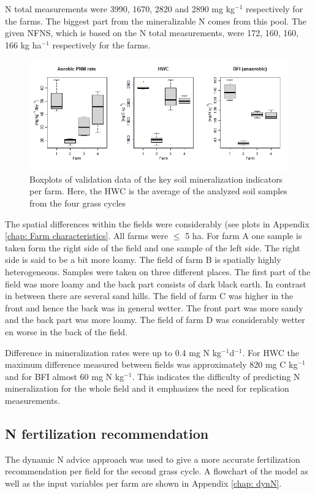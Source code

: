 \documentclass[10pt,twoside,dutch,english]{report}
\begin{document}
N total measurements were 3990, 1670, 2820 and 2890 mg kg$^{-1}$ respectively for the farms. The biggest part from the mineralizable N comes from this pool. The given NFNS, which is based on the N total measurements, were 172, 160, 160, 166 kg ha$^{-1}$ respectively for the farms. 


	\begin{figure}[ht] %
		\centering
		\includegraphics[width=1\linewidth]{results_valbox}
		\caption{Boxplots of validation data of the key soil mineralization indicators per farm. Here, the HWC is the average of the analyzed soil samples from the four grass cycles}
		\label{fig:results_valbox}
	\end{figure}
The spatial differences within the fields were considerably (see plots in Appendix \ref{chap: Farm characteristics}. All farms were $\leq$ 5 ha. For farm A one sample is taken form the right side of the field and one sample of the left side. The right side is said to be a bit more loamy.  The field of farm B is spatially highly heterogeneous. Samples were taken on three different places. The first part of the field was more loamy and the back part consists of dark black earth. In contrast in between there are several sand hills. The field of farm C was higher in the front and hence the back was in general wetter. The front part was more sandy and the back part was more loamy. The field of farm D was considerably wetter en worse in the back of the field. 

Difference in mineralization rates were up to 0.4 mg N kg$^{-1}$d$^{-1}$. For HWC the maximum difference measured between fields was approximately 820 mg C kg$^{-1}$ and for BFI almost 60 mg N kg$^{-1}$. This indicates the difficulty of predicting N mineralization for the whole field and it emphasizes the need for replication measurements. 


\subsection{N fertilization recommendation}
The dynamic N advice approach was used to give a more accurate fertilization recommendation per field for the second grass cycle. A flowchart of the model as well as the input variables per farm are shown in Appendix \ref{chap: dynN}. 
\end{document}
